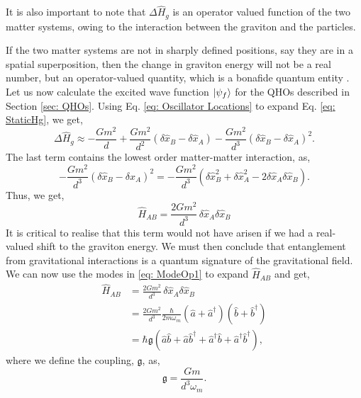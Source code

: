 \documentclass[12pt,a4paper]{report}
\theoremstyle{plain}
\theoremstyle{definition}
\theoremstyle{remark}
\renewcommand{\dag}{\dagger}
\newcommand{\Hab}{\hat{H}_{AB}}
\newcommand{\ahat}{\hat{a}}
\newcommand{\bhat}{\hat{b}}
\DeclarePairedDelimiter\ket{\lvert}{\rangle}
\begin{document}
It is also important to note that $\Delta\hat{H}_g$ is an operator valued function of the two matter systems, owing to the interaction between the graviton and the particles.

If the two matter systems are not in sharply defined positions, say they are in a spatial superposition, then the change in graviton energy will not be a real number, but an operator-valued quantity, which is a bonafide quantum entity \cite{Bose_2022}. Let us now calculate the excited wave function $\ket{\psi_f}$ for the QHOs described in Section \ref{sec: QHOs}. Using Eq. \ref{eq: Oscillator Locations} to expand Eq. \ref{eq: StaticHg}, we get,
\begin{equation}
    \Delta\hat{H}_{g}\approx-\frac{Gm^{2}}{d}+\frac{Gm^{2}}{d^{2}}(\delta\hat{x}_{B}-\delta\hat{x}_{A})-\frac{Gm^{2}}{d^{3}}(\delta\hat{x}_{B}-\delta\hat{x}_{A})^{2}.
\end{equation}
The last term contains the lowest order matter-matter interaction, as,
\begin{equation}
    -\frac{Gm^{2}}{d^{3}}(\delta\hat{x}_{B}-\delta\hat{x}_{A})^{2} = -\frac{Gm^{2}}{d^{3}}(\delta\hat{x}_{B}^2+\delta\hat{x}_{A}^2 - 2\delta\hat{x}_{A}\delta\hat{x}_{B}).
\end{equation}
Thus, we get,
\begin{equation}
    \Hab = \frac{2Gm^{2}}{d^{3}}\,\delta\hat{x}_{A}\delta\hat{x}_{B}
\end{equation}
It is critical to realise that this term would not have arisen if we had a real-valued shift to the graviton energy. We must then conclude that entanglement from gravitational interactions is a quantum signature of the gravitational field.
We can now use the modes in \ref{eq: ModeOp1} to expand $\Hab$ and get,
\begin{equation}
    \begin{aligned}
        \Hab &= \frac{2Gm^{2}}{d^{3}}\,\delta\hat{x}_{A}\delta\hat{x}_{B} \\
        &= \frac{2Gm^{2}}{d^{3}} \frac{\hbar}{2m\omega_m} (\ahat + \ahat^{\dag})(\bhat + \bhat^{\dag}) \\
        &= \hbar \mathfrak{g} (\ahat\bhat+\ahat\bhat^{\dag}+\ahat^{\dag}\bhat+\ahat^{\dag}\bhat^{\dag}),
    \end{aligned}
\end{equation}
where we define the coupling, $\mathfrak{g}$, as,
\begin{equation}
    \mathfrak{g} = \frac{Gm}{d^3\omega_m}.
\end{equation}
\end{document}
